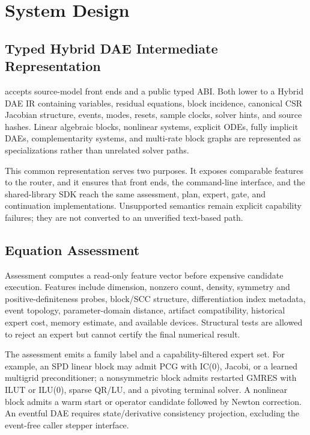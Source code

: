 \section{System Design}
\label{sec:design}

\subsection{Typed Hybrid DAE Intermediate Representation}

\system accepts source-model front ends and a public typed ABI. Both lower to a
Hybrid DAE IR containing variables, residual equations, block incidence, canonical
CSR Jacobian structure, events, modes, resets, sample clocks, solver hints, and
source hashes. Linear algebraic blocks, nonlinear systems, explicit ODEs, fully
implicit DAEs, complementarity systems, and multi-rate block graphs are represented
as specializations rather than unrelated solver paths.

This common representation serves two purposes. It exposes comparable features to
the router, and it ensures that front ends, the command-line interface, and the
shared-library SDK reach the same assessment, plan, expert, gate, and continuation
implementations. Unsupported semantics remain explicit capability failures; they
are not converted to an unverified text-based path.

\subsection{Equation Assessment}

Assessment computes a read-only feature vector before expensive candidate
execution. Features include dimension, nonzero count, density, symmetry and
positive-definiteness probes, block/SCC structure, differentiation index metadata,
event topology, parameter-domain distance, artifact compatibility, historical
expert cost, memory estimate, and available devices. Structural tests are allowed
to reject an expert but cannot certify the final numerical result.

The assessment emits a family label and a capability-filtered expert set. For
example, an SPD linear block may admit PCG with IC(0), Jacobi, or a learned
multigrid preconditioner; a nonsymmetric block admits restarted GMRES with ILUT or
ILU(0), sparse QR/LU, and a pivoting terminal solver. A nonlinear block admits a
warm start or operator candidate followed by Newton correction. An eventful DAE
requires state/derivative consistency projection, excluding the
event-free caller stepper interface.

